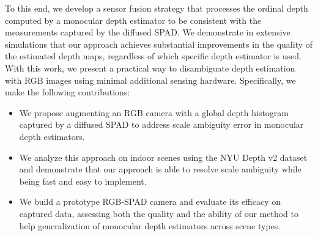 

To this end, we develop a sensor fusion strategy that processes the ordinal
depth computed by a monocular depth estimator to be consistent with the
measurements captured by the diffused SPAD. We demonstrate in extensive
simulations that our approach achieves substantial improvements in the quality
of the estimated depth maps, regardless of which specific depth estimator is
used.   With this
work, we present a practical way to disambiguate depth estimation with RGB
images using minimal additional sensing hardware. Specifically, we make the
following contributions:

%
\begin{itemize}
	\item We propose augmenting an RGB camera with a global depth histogram captured by a diffused SPAD to address scale ambiguity error in monocular depth estimators.	
  \item We analyze this approach on indoor scenes using the NYU Depth v2 dataset and demonstrate that our approach is able to resolve scale ambiguity while being fast and easy to implement.
	\item We build a prototype RGB-SPAD camera and evaluate its efficacy on captured data, assessing both the quality and the ability of our method to help generalization of monocular depth estimators across scene types. 
\end{itemize}


